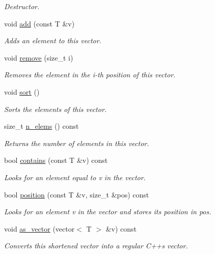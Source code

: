 \begin{DoxyCompactItemize}
\begin{DoxyCompactList}\small\item\em Destructor. \end{DoxyCompactList}\item 
void \hyperlink{classlgraph_1_1utils_1_1svector_a14ffd05a33eeae26ddb0909d8f64ad28}{add} (const T \&v)
\begin{DoxyCompactList}\small\item\em Adds an element to this vector. \end{DoxyCompactList}\item 
void \hyperlink{classlgraph_1_1utils_1_1svector_a9d377cbaa26f09a862334363e2d889cc}{remove} (size\+\_\+t i)
\begin{DoxyCompactList}\small\item\em Removes the element in the i-\/th position of this vector. \end{DoxyCompactList}\item 
void \hyperlink{classlgraph_1_1utils_1_1svector_ac2199e164429f7469decfa9d8f033069}{sort} ()
\begin{DoxyCompactList}\small\item\em Sorts the elements of this vector. \end{DoxyCompactList}\item 
size\+\_\+t \hyperlink{classlgraph_1_1utils_1_1svector_a36428d7450874d526ced6f1e8e0fe353}{n\+\_\+elems} () const 
\begin{DoxyCompactList}\small\item\em Returns the number of elements in this vector. \end{DoxyCompactList}\item 
bool \hyperlink{classlgraph_1_1utils_1_1svector_ab17c14abafd02d01a0e1f8230ed23680}{contains} (const T \&v) const 
\begin{DoxyCompactList}\small\item\em Looks for an element equal to {\itshape v} in the vector. \end{DoxyCompactList}\item 
bool \hyperlink{classlgraph_1_1utils_1_1svector_aed55a2e91d3ba407b5268ba339dddd81}{position} (const T \&v, size\+\_\+t \&pos) const 
\begin{DoxyCompactList}\small\item\em Looks for an element {\itshape v} in the vector and stores its position in {\itshape pos}. \end{DoxyCompactList}\item 
void \hyperlink{classlgraph_1_1utils_1_1svector_a8a801e9a3208655c4bbb21a7db75c58f}{as\+\_\+vector} (vector$<$ T $>$ \&v) const 
\begin{DoxyCompactList}\small\item\em Converts this shortened vector into a regular C++\textquotesingle{}s vector. \end{DoxyCompactList}\end{DoxyCompactItemize}
